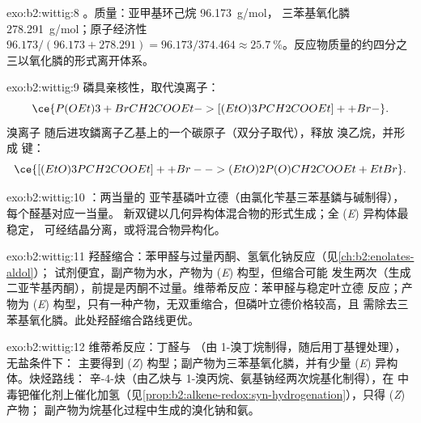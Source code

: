 \begin{solution}{exo:b2:wittig:8}
。质量：亚甲基环己烷 \qty{96.173}{g/mol}，
三苯基氧化膦 \qty{278.291}{g/mol}；原子经济性 $96.173/(96.173 + 278.291) =
96.173/374.464 \approx 25.7~\%$。反应物质量的约四分之三以氧化膦的形式离开体系。
\end{solution}

\begin{solution}{exo:b2:wittig:9}
磷具亲核性，取代溴离子：
\begin{equation*}
\ce{P(OEt)3 + BrCH2COOEt -> [(EtO)3PCH2COOEt]+ + Br-}.
\end{equation*}
溴离子
随后进攻鏻离子乙基上的一个碳原子（双分子取代），释放
溴乙烷，并形成  键：
\begin{equation*}
\ce{[(EtO)3PCH2COOEt]+ + Br- -> (EtO)2P(O)CH2COOEt + EtBr}.
\end{equation*}
\end{solution}

\begin{solution}{exo:b2:wittig:10}
：两当量的
亚苄基磷叶立德（由氯化苄基三苯基鏻与碱制得），每个醛基对应一当量。
新双键以几何异构体混合物的形式生成；全 (\textit{E}) 异构体最稳定，
可经结晶分离，或将混合物异构化。
\end{solution}

\begin{solution}{exo:b2:wittig:11}
羟醛缩合：苯甲醛与过量丙酮、氢氧化钠反应（见\cref{ch:b2:enolates-aldol}）；
试剂便宜，副产物为水，产物为 (\textit{E}) 构型，但缩合可能
发生两次（生成二亚苄基丙酮），前提是丙酮不过量。维蒂希反应：苯甲醛与稳定叶立德
 反应；产物为 (\textit{E}) 构型，只有一种产物，无双重缩合，但磷叶立德价格较高，且
需除去三苯基氧化膦。此处羟醛缩合路线更优。
\end{solution}

\begin{solution}{exo:b2:wittig:12}
维蒂希反应：丁醛与 （由 1-溴丁烷制得，随后用丁基锂处理），无盐条件下：
主要得到 (\textit{Z}) 构型；副产物为三苯基氧化膦，并有少量 (\textit{E}) 异构体。炔烃路线：
辛-4-炔（由乙炔与 1-溴丙烷、氨基钠经两次烷基化制得），在
中毒钯催化剂上催化加氢（见\cref{prop:b2:alkene-redox:syn-hydrogenation}），只得 (\textit{Z}) 产物；
副产物为烷基化过程中生成的溴化钠和氨。
\end{solution}

